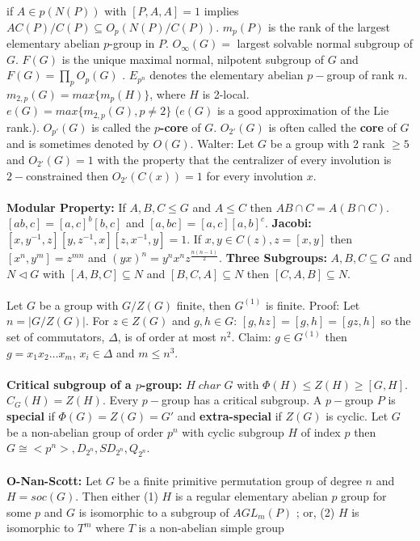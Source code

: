 if $A \in p(N(P))$ with $[P,A,A]= 1$ implies $A C(P)/C(P) \subseteq O_p (N(P)/C(P))$.
$m_p(P)$ is the rank of the largest elementary abelian $p$-group in $P$.
$O_{\infty}(G)=$ largest solvable normal subgroup of $G$.
$F(G)$ is the unique maximal normal, nilpotent subgroup of $G$ and
$F(G)= \prod_p O_p(G)$ .
$E_{p^n}$ denotes the elementary abelian $p-$group of rank $n$.
$m_{2,p}(G) = max \{ m_p (H) \}$, where $H$ is 2-local.
$e(G) = max \{ m_{2,p} (G), p \ne 2 \}$ ($e(G)$ is a good approximation of
the Lie rank.).
$O_{p'}(G)$ is called the {\bf $p$-core} of $G$. $O_{2'}(G)$ is often called the
{\bf core} of $G$ and is sometimes denoted by $O(G)$.
Walter: Let $G$ be a group with 2 rank $\ge 5$ and $O_{2'}(G)=1$ with the property
that the centralizer of every involution is $2-$constrained then $O_{2'}(C(x))=1$ for
every involution $x$.\\
\\
{\bf Modular Property:} If $A, B, C \le G$ and $A \le C$ then $AB \cap C= A(B \cap C)$.
$[ab,c]= [a,c]^b [b,c]$ and $[a,bc]=[a,c] [a,b]^c$.  
{\bf Jacobi:} $ [x, y^{-1}, z] [y, z^{-1}, x] [z, x^{-1}, y]=1$.
If $x,y \in C(z), z=[x,y]$ then
$[x^n , y^m ]= z^{mn}$ and $(yx)^n= y^n x^n z^{\frac {n(n-1)} 2}$.  
{\bf Three Subgroups:} $A, B, C \subseteq G$ and
$N \lhd G$ with
$[A,B,C] \subseteq N$ and
$[B,C,A] \subseteq N$ then
$[C,A,B] \subseteq N$.\\
\\
Let $G$ be a group with $G/Z(G)$ finite, then $G^{(1)}$ is finite.  Proof:
Let $n= |G/Z(G)|$.  For $z \in Z(G)$ and $g,h \in G$: $[g,hz]=[g,h]=[gz,h]$ so the 
set of commutators, $\Delta$, is of order at most $n^2$.
Claim: $g \in G^{(1)}$ then $g= x_1 x_2 \ldots x_m$, $x_i \in \Delta$ and
$m \le n^3$.\\
\\
{\bf Critical subgroup of a $p$-group:}
$H \; char \; G$ with $\Phi(H) \le Z(H) \ge [G,H]$.
$C_G(H)=Z(H)$.  Every $p-$group has a critical subgroup.
A $p-$group $P$ is {\bf special} if $\Phi(G)=Z(G)=G'$ and {\bf extra-special}
if $Z(G)$ is cyclic.
Let $G$ be a non-abelian group of order $p^n$ with cyclic subgroup
$H$ of index $p$ then $G \cong <p^n>, D_{2^n}, SD_{2^n}, Q_{2^n}$.\\
\\
{\bf O-Nan-Scott:}  Let $G$ be a finite primitive permutation group of degree $n$ and
$H=soc(G)$.  Then either (1) $H$ is a regular elementary abelian $p$ group for
some $p$ and $G$ is isomorphic to a subgroup of
$AGL_m(P)$ ; or, (2) $H$ is isomorphic to $T^m$ where $T$ is a non-abelian simple group
